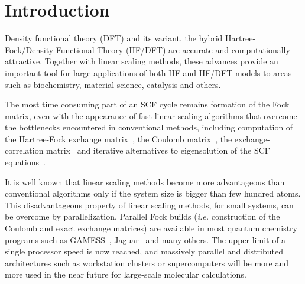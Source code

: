 \documentclass[prl,twocolumn,twocolumngrid,superbib]{revtex4} %
\begin{document}
\section{Introduction}

 Density functional theory (DFT) and its variant, 
 the hybrid Hartree-Fock/Density Functional Theory (HF/DFT) are accurate and
 computationally attractive. Together with linear scaling methods, these
 advances provide an important tool for large applications
 of both HF and HF/DFT models to areas such as biochemistry, 
 material science, catalysis and others.


 The most time consuming part of an SCF cycle remains formation
 of the Fock matrix, even with the appearance of fast linear
 scaling algorithms 
 that overcome the bottlenecks encountered in conventional methods,
 including computation of the Hartree-Fock exchange 
 matrix~\cite{ESchwegler96,ESchwegler97,ESchwegler98A,ESchwegler99,ESchwegler00,CTymczak04b},
 the Coulomb 
 matrix~\cite{CWhite94B,CWhite96A,MChallacombe96,MChallacombe96B,MStrain96,
              JPerezjorda97,MChallacombe97,CTymczak04a}, 
 the exchange-correlation 
 matrix~\cite{CTymczak04a,Jorda95,RStratmann96,CGuerra98,MChallacombe00A}
 and iterative alternatives to eigensolution of the SCF 
 equations~\cite{XLi93,MDaw93,ADaniels97,APalser98,
                 MChallacombe99,ANiklasson02A,ANiklasson03}.

 It is well known that linear scaling 
 methods become more advantageous than conventional  
 algorithms only if the system size is bigger than
 few hundred atoms. This disadvantageous property of linear
 scaling methods, for small systems, can be overcome by 
 parallelization. 
 Parallel Fock builds ({\em i.e.} construction of the Coulomb and exact exchange matrices)
 are available in most quantum
 chemistry programs such as GAMESS~\cite{GAMESS},
 Jaguar~\cite{DChasman98} and many others. 
 The upper limit of a single processor speed
 is now reached, and massively parallel and distributed
 architectures such as workstation clusters or supercomputers will be 
 more and more used in the near future for large-scale 
 molecular calculations.
\end{document}
